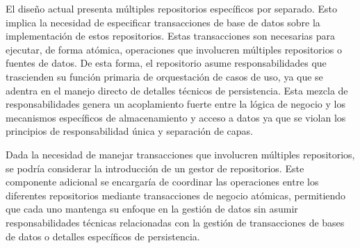 El diseño actual presenta múltiples repositorios específicos por separado. Esto implica la necesidad de especificar transacciones de base de datos sobre la implementación de estos repositorios. Estas transacciones son necesarias para ejecutar, de forma atómica, operaciones que involucren múltiples repositorios o fuentes de datos. De esta forma, el repositorio asume responsabilidades que trascienden su función primaria de orquestación de casos de uso, ya que se adentra en el manejo directo de detalles técnicos de persistencia. Esta mezcla de responsabilidades genera un acoplamiento fuerte entre la lógica de negocio y los mecanismos específicos de almacenamiento y acceso a datos ya que se violan los principios de responsabilidad única y separación de capas.

Dada la necesidad de manejar transacciones que involucren múltiples repositorios, se podría considerar la introducción de un gestor de repositorios. Este componente adicional se encargaría de coordinar las operaciones entre los diferentes repositorios mediante transacciones de negocio atómicas, permitiendo que cada uno mantenga su enfoque en la gestión de datos sin asumir responsabilidades técnicas relacionadas con la gestión de transacciones de bases de datos o detalles específicos de persistencia.



